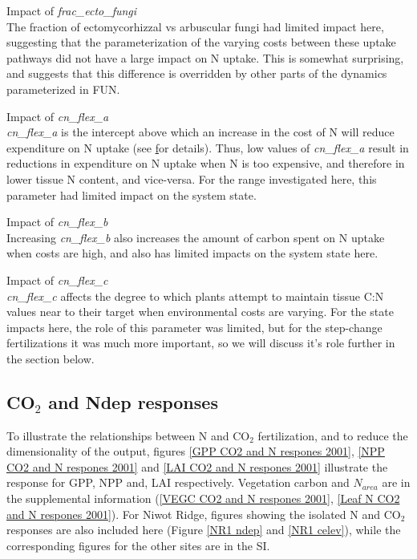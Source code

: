 \documentclass[draft,linenumbers]{agujournal}
\begin{document}
Impact of \emph{frac\_ecto\_fungi}\\
The fraction of ectomycorhizzal vs arbuscular fungi had limited impact here, suggesting that the parameterization of the varying costs between these uptake pathways did not have a large impact on N uptake. This is somewhat surprising, and suggests that this difference is overridden by other parts of the dynamics parameterized in FUN.

Impact of \emph{cn\_flex\_a}\\
\emph{cn\_flex\_a}  is the intercept above which an increase in the cost of N will reduce expenditure on N uptake (see \href{https://escomp.github.io/ctsm-docs/doc/build/html/tech_note/FUN/CLM50_Tech_Note_FUN.html#modifications-to-allow-variation-in-c-n-ratios} for details). Thus, low values of \emph{cn\_flex\_a}  result in reductions in expenditure on N uptake when N is too expensive, and therefore in lower tissue N content, and vice-versa.   For the range investigated here, this parameter had limited impact on the system state. 

Impact of \emph{cn\_flex\_b}\\
Increasing \emph{cn\_flex\_b} also increases the amount of carbon spent on N uptake when costs are high, and also has limited impacts on the system state here.

Impact of \emph{cn\_flex\_c}\\
 \emph{cn\_flex\_c} affects the degree to which plants attempt to maintain tissue C:N values near to their target when environmental costs are varying. For the state impacts here, the role of this parameter was limited, but for the step-change fertilizations it was much more important, so we will discuss it's role further in the section below. 

\subsection{CO$_{2}$ and Ndep responses}
To illustrate the relationships between N and CO$_{2}$ fertilization, and to reduce the dimensionality of the output, figures \ref{GPP CO2 and N respones 2001}, \ref{NPP CO2 and N respones 2001} and \ref{LAI CO2 and N respones 2001} illustrate the response for GPP, NPP and, LAI respectively. Vegetation carbon and $N_{area}$ are in the supplemental information (\ref{VEGC CO2 and N respones 2001}, \ref{Leaf N CO2 and N respones 2001}).  For Niwot Ridge, figures showing the isolated N and CO$_{2}$ responses are also included here (Figure \ref{NR1 ndep} and \ref{NR1 celev}), while the corresponding figures for the other sites are in the SI.
\end{document}
